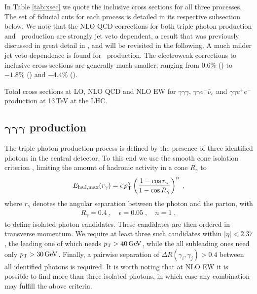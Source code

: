 In Table \ref{tab:xsec} we quote the inclusive cross sections for all 
three processes. 
The set of fiducial cuts for each process is detailed in its 
respective subsection below. 
We note that the NLO QCD corrections for both triple photon 
production and \aaw\ production are strongly jet veto dependent, 
a result that was previously discussed in great detail in 
\cite{Bozzi:2011en,Bozzi:2011wwa}, and will be revisited in the 
following. 
A much milder jet veto dependence is found for \aaz\ production. 
The electroweak corrections to inclusive cross sections are 
generally much smaller, ranging from $0.6\%$ (\aaa) to $-1.8\%$ (\aaw) 
and $-4.4\%$ (\aaz).

\begin{table}[t!]
  
  \caption{
    Total cross sections at LO, NLO QCD and NLO EW for $\gamma\gamma\gamma$, 
    $\gamma\gamma e^-\bar\nu_e$ and $\gamma\gamma e^+e^-$
    production at 13\,TeV at the LHC.
    \label{tab:xsec}
  } 
\end{table}


\subsection[\texorpdfstring{$\gamma\gamma\gamma$}{aaa} production]
           {$\boldsymbol{\gamma\gamma\gamma}$ production}
\label{sec:results:aaa}

The triple photon production process is defined 
by the presence of three identified photons in the 
central detector. 
To this end we use the smooth cone isolation 
criterion \cite{Frixione:1998jh}, limiting the amount of 
hadronic activity in a cone $R_\gamma$ to
\begin{equation}
  \begin{split}
    E_{{\rm had, max}} (r_{\gamma})
    = \epsilon\, p_\text{T}^{\gamma} \left( \frac{1-\cos r_\gamma}
				       {1-\cos R_\gamma}\right)^{n}\;,
  \end{split}
  \label{eq:frix}
\end{equation}
where $r_{\gamma}$ denotes the angular separation between the photon and 
the parton, with 
\begin{equation}
  \label{eq:coneparams}
  \begin{split}
    R_{\gamma}=0.4\;, \quad \epsilon = 0.05\;, \quad n = 1\;, 
  \end{split}
\end{equation}
to define isolated photon candidates.
These candidates are then ordered in transverse momentum. 
We require at least three such candidates within $|\eta|<2.37$, 
the leading one of which needs $p_\text{T}>40\,\text{GeV}$, 
while the all subleading ones need only 
$p_\text{T}>30\,\text{GeV}$. 
Finally, a pairwise separation of $\Delta R(\gamma_i,\gamma_j)>0.4$ 
between all identified photons is required.
It is worth noting that at NLO EW it is possible to find more 
than three isolated photons, in which case any combination may 
fulfill the above criteria. 

